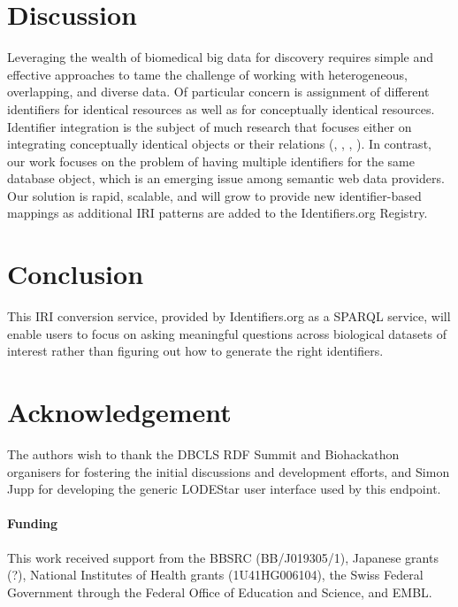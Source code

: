 \documentclass{bioinfo}
\begin{document}
\section{Discussion}
Leveraging the wealth of biomedical big data for discovery requires simple and effective approaches to tame the challenge of working with heterogeneous, overlapping, and diverse data. Of particular concern is assignment of different identifiers for identical resources as well as for conceptually identical resources. Identifier integration is the subject of much research that focuses either on integrating conceptually identical objects or their relations (\cite{VanIersel2010}, \cite{Wein2012}, \cite{Smith2007}, \cite{Chambers2013}). In contrast, our work focuses on the problem of having multiple identifiers for the same database object, which is an emerging issue among semantic web data providers. Our solution is rapid, scalable, and will grow to provide new identifier-based mappings as additional IRI patterns are added to the Identifiers.org Registry. 

\section{Conclusion}
This IRI conversion service, provided by Identifiers.org as a SPARQL service, will enable users to focus on asking meaningful questions across biological datasets of interest rather than figuring out how to generate the right identifiers. 

\section*{Acknowledgement}
The authors wish to thank the DBCLS RDF Summit and Biohackathon organisers for fostering the initial discussions and development efforts, and Simon Jupp for developing the generic LODEStar user interface used by this endpoint.

\paragraph{Funding\textcolon} 
This work received support from the BBSRC (BB/J019305/1), Japanese grants (?), National Institutes of Health grants (1U41HG006104), the Swiss Federal Government through the Federal Office of Education and Science, and EMBL.  


%
%
%
%
%
%
  
\end{document}
